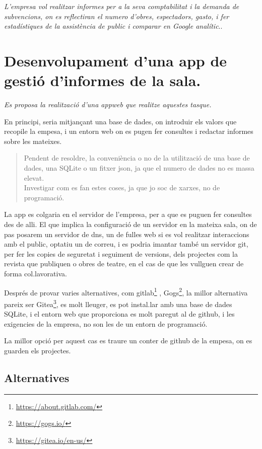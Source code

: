 \documentclass[
  10pt,
]{book}
\DeclareRobustCommand{\href}[2]{#2\footnote{\url{#1}}}
\begin{document}
\emph{L'empresa vol realitzar informes per a la seva comptabilitat i la demanda de subvencions, on es reflectiran el numero d'obres, espectadors, gasto, i fer estadístiques de la assistència de public i comparar en Google analític}..

\hypertarget{desenvolupament-duna-app-de-gestiuxf3-dinformes-de-la-sala.}{%
\section{Desenvolupament d'una app de gestió d'informes de la sala.}\label{desenvolupament-duna-app-de-gestiuxf3-dinformes-de-la-sala.}}

\emph{Es proposa la realització d'una appweb que realitze aquestes tasque.}

En principi, seria mitjançant una base de dades, on introduir els valors que recopile la empesa, i un entorn web on es pugen fer consultes i redactar informes sobre les mateixes.

\begin{quote}
Pendent de resoldre, la conveniència o no de la utilització de una base de dades, una SQLite o un fitxer json, ja que el numero de dades no es massa elevat.\\
Investigar com es fan estes coses, ja que jo soc de xarxes, no de programació.
\end{quote}

La app es colgaria en el servidor de l'empresa, per a que es puguen fer consultes des de alli. El que implica la configuració de un servidor en la mateixa sala, on de pas posarem un servidor de dns, un de fulles web si es vol realitzar interaccions amb el public, optatiu un de correu, i es podria imantar també un servidor git, per fer les copies de seguretat i seguiment de versions, dels projectes com la revista que publiquen o obres de teatre, en el cas de que les vullguen crear de forma col.lavorativa.

Després de provar varies alternatives, com \href{https://about.gitlab.com/}{gitlab} , \href{https://gogs.io/}{Gogs}, la millor alternativa pareix ser \href{https://gitea.io/en-us/}{Gitea}, es molt lleuger, es pot instal.lar amb una base de dades SQLite, i el entorn web que proporciona es molt paregut al de github, i les exigencies de la empresa, no son les de un entorn de programació.

La millor opció per aquest cas es traure un conter de github de la empesa, on es guarden els projectes.

\hypertarget{alternatives}{%
\subsection{Alternatives}\label{alternatives}}
\end{document}
